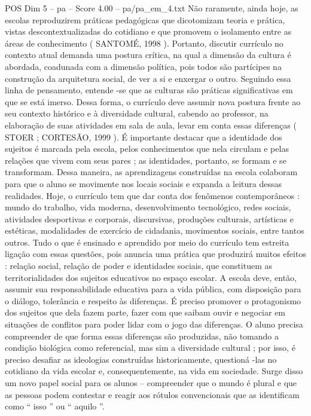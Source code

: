 \begin{textsample}{POS Dim 5 – pa – Score 4.00 – pa/pa\_em\_4.txt}
Não raramente, ainda hoje, as escolas reproduzirem práticas pedagógicas que dicotomizam teoria e prática, vistas descontextualizadas do cotidiano e que promovem o isolamento entre as áreas de conhecimento ( SANTOMÉ, 1998 ).
Portanto, discutir currículo no contexto atual demanda uma postura crítica, na qual a dimensão da cultura é abordada, coadunada com a dimensão política, pois todos são partícipes na construção da arquitetura social, de ver a si e enxergar o outro.
Seguindo essa linha de pensamento, entende -se que as culturas são práticas significativas em que se está imerso.
Dessa forma, o currículo deve assumir nova postura frente ao seu contexto histórico e à diversidade cultural, cabendo ao professor, na elaboração de suas atividades em sala de aula, levar em conta essas diferenças ( STOER ; CORTESÃO, 1999 ).
É importante destacar que a identidade dos sujeitos é marcada pela escola, pelos conhecimentos que nela circulam e pelas relações que vivem com seus pares ; as identidades, portanto, se formam e se transformam.
Dessa maneira, as aprendizagens construídas na escola colaboram para que o aluno se movimente nos locais sociais e expanda a leitura dessas realidades.
Hoje, o currículo tem que dar conta dos fenômenos contemporâneos : mundo do trabalho, vida moderna, desenvolvimento tecnológico, redes sociais, atividades desportivas e corporais, discursivas, produções culturais, artísticas e estéticas, modalidades de exercício de cidadania, movimentos sociais, entre tantos outros.
Tudo o que é ensinado e aprendido por meio do currículo tem estreita ligação com essas questões, pois anuncia uma prática que produzirá muitos efeitos : relação social, relação de poder e identidades sociais, que constituem as territorialidades dos sujeitos educativos no espaço escolar.
A escola deve, então, assumir sua responsabilidade educativa para a vida pública, com disposição para o diálogo, tolerância e respeito às diferenças.
É preciso promover o protagonismo dos sujeitos que dela fazem parte, fazer com que saibam ouvir e negociar em situações de conflitos para poder lidar com o jogo das diferenças.
O aluno precisa compreender de que forma essas diferenças são produzidas, não tomando a condição biológica como referencial, mas sim a diversidade cultural ; por isso, é preciso desafiar as ideologias construídas historicamente, questioná -las no cotidiano da vida escolar e, consequentemente, na vida em sociedade.
Surge disso um novo papel social para os alunos – compreender que o mundo é plural e que as pessoas podem contestar e reagir aos rótulos convencionais que as identificam como “ isso ” ou “ aquilo ”.

\end{textsample}
